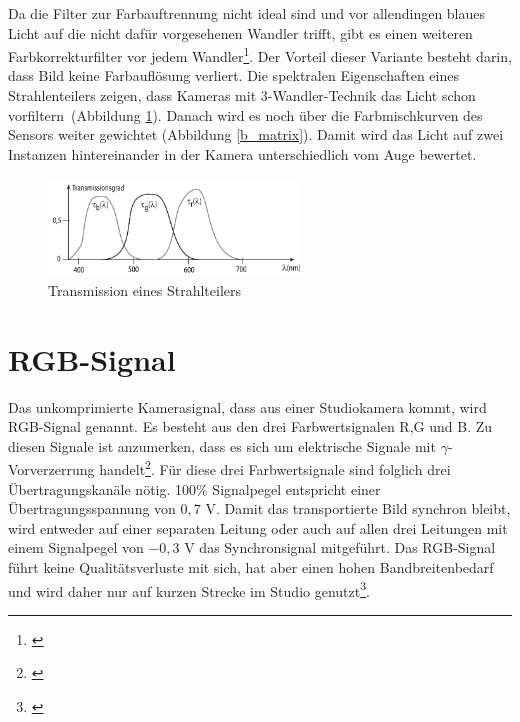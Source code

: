 Da die Filter zur Farbauftrennung nicht ideal sind und vor allendingen blaues Licht auf die nicht dafür vorgesehenen Wandler trifft, gibt es einen weiteren Farbkorrekturfilter vor jedem Wandler\footnote{\cite[379]{schmidt}}. Der Vorteil dieser Variante besteht darin, dass Bild keine Farbauflösung verliert. Die spektralen Eigenschaften eines Strahlenteilers zeigen, dass Kameras mit 3-Wandler-Technik das Licht schon \glqq vorfiltern\grqq\ (Abbildung \ref{b_twandler}). Danach wird es noch über die Farbmischkurven des Sensors weiter gewichtet (Abbildung \ref{b_matrix}). Damit wird das Licht  auf zwei Instanzen hintereinander in der Kamera unterschiedlich vom Auge bewertet.

\begin{figure}[H]     %
\centering
\includegraphics[width=0.6\textwidth]{bilder/twandler} 
\caption {Transmission eines Strahlteilers\protect\footnotemark}\label{b_twandler}
\end{figure}


\section{RGB-Signal}
\label{sec_rgbsignal}
Das unkomprimierte Kamerasignal, dass aus einer Studiokamera kommt, wird RGB-Signal genannt. Es besteht aus den drei Farbwertsignalen R,G und B. Zu diesen Signale ist anzumerken, dass es sich um elektrische Signale mit $\gamma$-Vorverzerrung handelt\footnote{\cite[82]{schmidt}}. Für diese drei Farbwertsignale sind folglich drei Übertragungskanäle nötig. 100\% Signalpegel entspricht einer Übertragungsspannung von $0,7$ V. Damit das transportierte Bild synchron bleibt, wird entweder auf einer separaten Leitung oder auch auf allen drei Leitungen mit einem Signalpegel von $-0,3$ V das Synchronsignal mitgeführt. Das RGB-Signal führt keine Qualitätsverluste mit sich, hat aber einen hohen Bandbreitenbedarf und wird daher nur auf kurzen Strecke im Studio genutzt\footnote{\cite[83]{schmidt}}.

